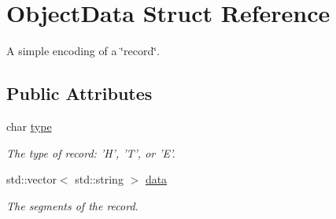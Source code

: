 \hypertarget{structObjectData}{
\section{ObjectData Struct Reference}
\label{structObjectData}
}


A simple encoding of a \char`\"{}record\char`\"{}.  


\subsection*{Public Attributes}
\begin{DoxyCompactItemize}
\item 
\hypertarget{structObjectData_a77f1a74deb864606b1b5cc115c2a99a5}{
char \hyperlink{structObjectData_a77f1a74deb864606b1b5cc115c2a99a5}{type}}
\label{structObjectData_a77f1a74deb864606b1b5cc115c2a99a5}

\begin{DoxyCompactList}\small\item\em The type of record: 'H', 'T', or 'E'. \item\end{DoxyCompactList}\item 
\hypertarget{structObjectData_af755ea276bafd67e377e869950c1eb48}{
std::vector$<$ std::string $>$ \hyperlink{structObjectData_af755ea276bafd67e377e869950c1eb48}{data}}
\label{structObjectData_af755ea276bafd67e377e869950c1eb48}

\begin{DoxyCompactList}\small\item\em The segments of the record. \item\end{DoxyCompactList}\end{DoxyCompactItemize}


